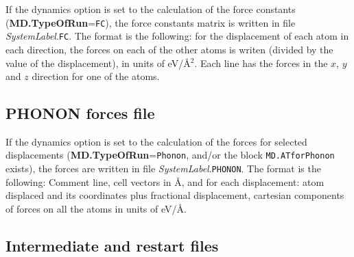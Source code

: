 \documentclass[11pt]{article}
\begin{document}
If the dynamics option is set to the calculation 
of the force constants ({\bf MD.TypeOfRun}={\tt FC}),
the force constants matrix is written in file {\it SystemLabel}.{\tt FC}.
The format is the following: for the displacement of
each atom in each direction, the forces on each of the other
atoms is writen (divided by the value of the displacement),
in units of eV/\AA$^2$. Each line has the forces in the $x$, $y$
and $z$ direction for one of the atoms.

\subsection{PHONON forces file}

If the dynamics option is set to the calculation of the forces for
selected displacements ({\bf MD.TypeOfRun}={\tt Phonon}, and/or the
block {\tt MD.ATforPhonon} exists), the forces
are written in file {\it SystemLabel}.{\tt PHONON}.  The format is the
following: Comment line, cell vectors in {\AA}, and for each
displacement: atom displaced and its coordinates plus fractional
displacement, cartesian components of forces on all the atoms in units
of eV/\AA.


\subsection{Intermediate and restart files}
\end{document}
